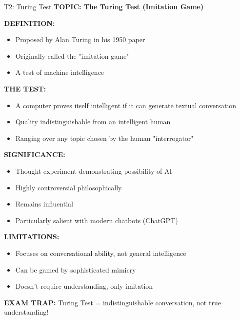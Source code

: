 \documentclass[8pt]{beamer}
\begin{document}
	\begin{frame}{T2: Turing Test}
		\fontsize{6.5}{7.5}\selectfont
		\textbf{TOPIC: The Turing Test (Imitation Game)}
		
		\vspace{0.1cm}
		\textbf{DEFINITION:}
		\begin{itemize}
			\item Proposed by Alan Turing in his 1950 paper
			\item Originally called the "imitation game"
			\item A test of machine intelligence
		\end{itemize}
		
		\vspace{0.1cm}
		\textbf{THE TEST:}
		\begin{itemize}
			\item A computer proves itself intelligent if it can generate textual conversation
			\item Quality indistinguishable from an intelligent human
			\item Ranging over any topic chosen by the human "interrogator"
		\end{itemize}
		
		\vspace{0.1cm}
		\textbf{SIGNIFICANCE:}
		\begin{itemize}
			\item Thought experiment demonstrating possibility of AI
			\item Highly controversial philosophically
			\item Remains influential
			\item Particularly salient with modern chatbots (ChatGPT)
		\end{itemize}
		
		\vspace{0.1cm}
		\textbf{LIMITATIONS:}
		\begin{itemize}
			\item Focuses on conversational ability, not general intelligence
			\item Can be gamed by sophisticated mimicry
			\item Doesn't require understanding, only imitation
		\end{itemize}
		
		\textcolor{myred}{\textbf{EXAM TRAP:}} Turing Test = \textcolor{myblue}{indistinguishable conversation}, not true understanding!
	\end{frame}
	
\end{document}

